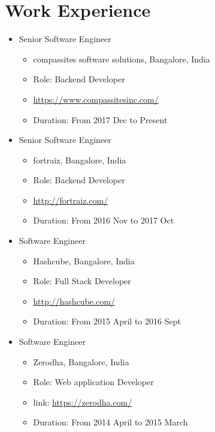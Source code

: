 \documentclass[11pt,a4paper]{moderncv}
\begin{document}
\section{Work Experience}
    \begin{itemize}
        \item Senior Software Engineer
        \begin{itemize}
            \item compassites software solutions, Bangalore, India
            \item Role: Backend Developer
            \item {\url{https://www.compassitesinc.com/}}
            \item Duration: From 2017 Dec to Present 
        \end{itemize}
    \end{itemize}
    \begin{itemize}
        \item Senior Software Engineer
        \begin{itemize}
            \item fortraiz, Bangalore, India
            \item Role: Backend Developer
            \item {\url{http://fortraiz.com/}}
            \item Duration: From 2016 Nov to 2017 Oct 
        \end{itemize}
    \end{itemize}
    \begin{itemize}
        \item Software Engineer
        \begin{itemize}
            \item Hashcube, Bangalore, India
            \item Role: Full Stack Developer  
            \item {\url{http://hashcube.com/}}
            \item Duration: From 2015 April to 2016 Sept
        \end{itemize}
    \end{itemize}
    \begin{itemize}
        \item Software Engineer
        \begin{itemize}
            \item Zerodha, Bangalore, India
            \item Role: Web application Developer
            \item link: {\url{https://zerodha.com/}}
            \item Duration: From 2014 April to 2015 March 
        \end{itemize}
    \end{itemize}
\pagebreak
\end{document}
